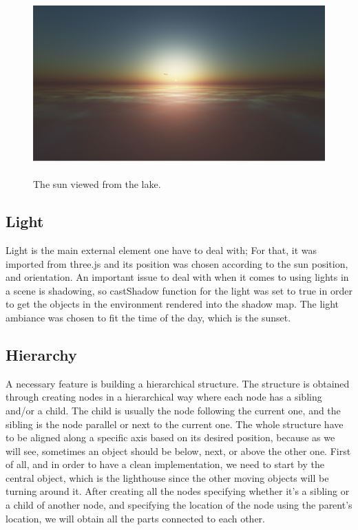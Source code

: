 \documentclass[paper=a4, fontsize=11pt]{scrartcl} %
\numberwithin{equation}{section} %
\numberwithin{figure}{section} %
\numberwithin{table}{section} %
\begin{document}
\begin{figure}[!ht]
\centering
\includegraphics[width=15cm, height=7cm]{images/sun.png}
\caption{The sun viewed from the lake.}
\label{sun}
\end{figure}
\newpage

\subsection{Light}

Light is the main external element one have to deal with; For that, it was imported from three.js and its position was chosen according to the sun position, and orientation. An important issue to deal with when it comes to using lights in a scene is shadowing, so castShadow function for the light was set to true in order to get the objects in the environment rendered into the shadow map. The light ambiance was chosen to fit the time of the day, which is the sunset.

\subsection{Hierarchy}

A necessary feature is building a hierarchical structure. The structure is obtained through creating nodes in a hierarchical way where each node has a sibling and/or a child. The child is usually the node following the current one, and the sibling is the node parallel or next to the current one. The whole structure have to be aligned along a specific axis based on its desired position, because as we will see, sometimes an object should be below, next, or above the other one. First of all, and in order to have a clean implementation, we need to start by the central object, which is the lighthouse since the other moving objects will be turning around it. After creating all the nodes specifying whether it's a sibling or a child of another node, and specifying the location of the node using the parent's location, we will obtain all the parts connected to each other.
\end{document}

